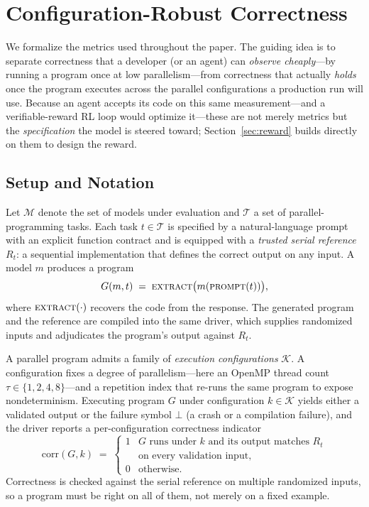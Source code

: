 \section{Configuration-Robust Correctness}
\label{sec:metric}

We formalize the metrics used throughout the paper. The guiding idea is to
separate correctness that a developer (or an agent) can \emph{observe cheaply}---by
running a program once at low parallelism---from correctness that actually
\emph{holds} once the program executes across the parallel configurations a
production run will use. Because an agent accepts its code on this same
measurement---and a verifiable-reward RL loop would optimize it---these are not
merely metrics but the \emph{specification} the model is steered toward;
Section~\ref{sec:reward} builds directly on them to design the reward.

\subsection{Setup and Notation}
Let $\mathcal{M}$ denote the set of models under evaluation and $\mathcal{T}$ a
set of parallel-programming tasks. Each task $t\in\mathcal{T}$ is specified by a
natural-language prompt with an explicit function contract and is equipped with a
\emph{trusted serial reference} $R_t$: a sequential implementation that defines
the correct output on any input. A model $m$ produces a program
\begin{equation}\label{eq:gen}
G(m,t) \;=\; \textsc{extract}\big(m(\textsc{prompt}(t))\big),
\end{equation}
where $\textsc{extract}(\cdot)$ recovers the code from the response. The generated
program and the reference are compiled into the same driver, which supplies
randomized inputs and adjudicates the program's output against $R_t$.

A parallel program admits a family of \emph{execution configurations}
$\mathcal{K}$. A configuration fixes a degree of parallelism---here an OpenMP
thread count $\tau\in\{1,2,4,8\}$---and a repetition index that re-runs the same
program to expose nondeterminism. Executing program $G$ under configuration
$k\in\mathcal{K}$ yields either a validated output or the failure symbol $\bot$
(a crash or a compilation failure), and the driver reports a per-configuration
correctness indicator
\begin{equation}\label{eq:corr}
\mathrm{corr}(G,k) \;=\;
\begin{cases}
1 & G\text{ runs under }k\text{ and its output matches }R_t\\
  & \text{on every validation input,}\\
0 & \text{otherwise.}
\end{cases}
\end{equation}
Correctness is checked against the serial reference on multiple randomized
inputs, so a program must be right on all of them, not merely on a fixed example.

